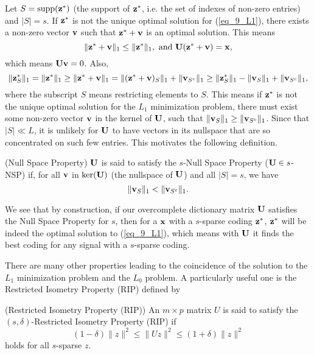 \documentclass[../book-template.tex]{subfiles}
\begin{document}
\par Let $S={\rm supp}({\bf z}^*)$ (the support of ${\bf z}^*$, i.e. the set of indexes of non-zero entries) and $|S|=s$. If ${\bf z}^*$ is not the unique optimal solution for (\ref{eq_9_L1}), there exists a non-zero vector ${\bf v}$ such that ${\bf z^*+v}$ is an optimal solution. This means
\begin{equation*}
	\|{\bf z^*+v}\|_1\leq \|{\bf z}^*\|_1,\text{ and }{\bf U(z^*+v)}={\bf x},
\end{equation*}
which means ${\bf Uv}=0$. Also,
\begin{equation*}
	\|{\bf z}^*_S\|_1 = \|{\bf z}^*\|_1 \geq \|{\bf z^*+v}\|_1 = 	\|({\bf z^*+v})_S\|_1 + \|{\bf v}_{S^c}\|_1 \geq \|{\bf z}^*_S\|_1 - \|{\bf v}_S\|_1 + \|{\bf v}_{S^c}\|_1,
\end{equation*}
where the subscript $S$ means restricting elements to $S$. This means if ${\bf z}^*$ is not the unique optimal solution for the $L_1$ minimization problem, there must exist some non-zero vector ${\bf v}$ in the kernel of ${\bf U}$, such that $\|{\bf v}_S\|_1\geq \|{\bf v}_{S^c}\|_1$. Since that $|S|\ll L$, it is unlikely for ${\bf U}$ to have vectors in its nullspace that are so concentrated on such few entries. This motivates the following definition.
\begin{definition}
	(Null Space Property) ${\bf U}$ is said to satisfy the $s$-Null Space Property (${\bf U}\in s$-NSP) if, for all ${\bf v}$ in ${\rm ker}({\bf U})$ (the nullspace of ${\bf U}$) and all $|S|=s$, we have
	\begin{equation*}
		\|{\bf v}_{S}\|_1<\|{\bf v}_{S^c}\|_1.
	\end{equation*}
\end{definition}
We see that by construction, if our overcomplete dictionary matrix ${\bf U}$ satisfies the Null Space Property for $s$, then for a ${\bf x}$ with a $s$-sparse coding ${\bf z}^*$, ${\bf z}^*$ will be indeed the optimal solution to (\ref{eq_9_L1}), which means with ${\bf U}$ it finds the best coding for any signal with a $s$-sparse coding.
\par There are many other properties leading to the coincidence of the solution to the $L_1$ minimization problem and the $L_0$ problem. A particularly useful one is the Restricted Isometry Property (RIP) defined by
\begin{definition}\label{def_9_RIP}
	(Restricted Isometry Property (RIP)) An $m\times p$ matrix $U$ is said to satisfy the $(s,\delta)$-Restricted Isometry Property (RIP) if 
	\begin{equation*}
		(1-\delta)\|z\|^2\leq \|Uz\|^2\leq (1+\delta)\|z\|^2
	\end{equation*}
	holds for all $s$-sparse $z$.
\end{definition}
\end{document}
